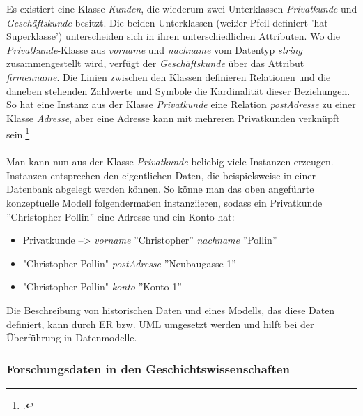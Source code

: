 \documentclass[12pt,a4paper]{article}
\begin{document}
Es existiert eine Klasse \textit{Kunden}, die wiederum zwei Unterklassen \textit{Privatkunde} und \textit{Geschäftskunde} besitzt. Die beiden Unterklassen (weißer Pfeil definiert 'hat Superklasse') unterscheiden sich in ihren unterschiedlichen Attributen. Wo die \textit{Privatkunde}-Klasse aus \textit{vorname} und \textit{nachname} vom Datentyp \textit{string} zusammengestellt wird, verfügt der \textit{Geschäftskunde} über das Attribut \textit{firmenname}. Die Linien zwischen den Klassen definieren Relationen und die daneben stehenden Zahlwerte und Symbole die Kardinalität dieser Beziehungen. So hat eine Instanz aus der Klasse \textit{Privatkunde} eine Relation \textit{postAdresse} zu einer Klasse \textit{Adresse}, aber eine Adresse kann mit mehreren Privatkunden verknüpft sein.\footcite[][S.99-108]{jannidis2017digital} 
\\
\\
Man kann nun aus der Klasse \textit{Privatkunde} beliebig viele Instanzen erzeugen. Instanzen entsprechen den eigentlichen Daten, die beispielsweise in einer Datenbank abgelegt werden können. So könne man das oben angeführte konzeptuelle Modell folgendermaßen instanziieren, sodass ein Privatkunde ''Christopher Pollin'' eine Adresse und ein Konto hat: 
\begin{itemize}
    \item[] Privatkunde --> \textit{vorname} ''Christopher'' \textit{nachname} ''Pollin''
    \item[] "Christopher Pollin" \textit{postAdresse} ''Neubaugasse 1''
    \item[] "Christopher Pollin" \textit{konto} ''Konto 1''
\end{itemize}{}

Die Beschreibung von historischen Daten und eines Modells, das diese Daten definiert, kann durch ER bzw. UML umgesetzt werden und hilft bei der Überführung in Datenmodelle. 
\subsubsection{Forschungsdaten in den Geschichtswissenschaften}
\label{forschungdaten}
\end{document}
